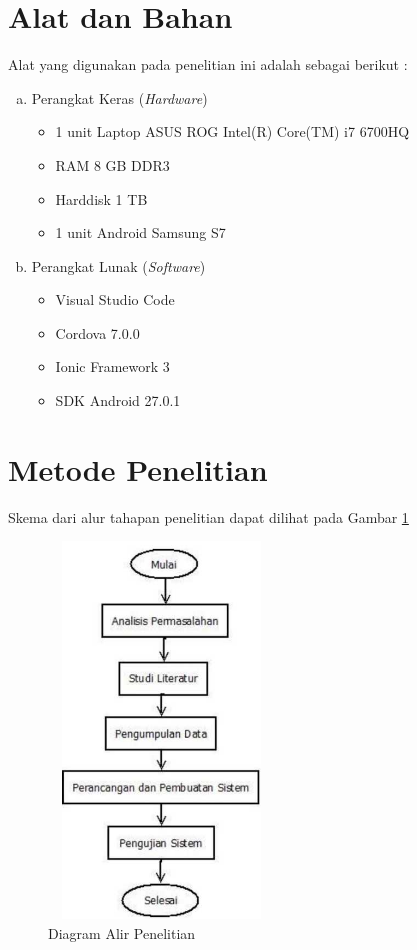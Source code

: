 \section{Alat dan Bahan}
Alat yang digunakan pada penelitian ini adalah sebagai berikut :

\begin{enumerate}[a.]
\item Perangkat Keras (\textit{Hardware})
	\begin{itemize}
		\item 1 unit Laptop ASUS ROG Intel(R) Core(TM) i7 6700HQ
		\item RAM 8 GB DDR3
		\item Harddisk 1 TB
		\item 1 unit Android Samsung S7
	\end{itemize}

\item Perangkat Lunak (\textit{Software})
	\begin{itemize}
		\item Visual Studio Code
		\item Cordova 7.0.0
		\item Ionic Framework 3
		\item SDK Android 27.0.1
	\end{itemize}
\end{enumerate}

\section{Metode Penelitian}
Skema dari alur tahapan penelitian dapat dilihat pada Gambar \ref{alur}
\vspace{-0.4cm}
\begin{figure}[H]
	\center
	\includegraphics [width = 6cm, height= 10cm]{gambar/alur2}
	\caption{Diagram Alir Penelitian}
	\label{alur}
\end{figure}

